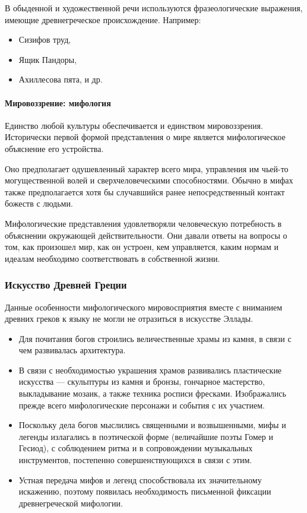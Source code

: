 В обыденной и художественной речи используются фразеологические выражения, имеющие древнегреческое происхождение. Например:
\begin{itemize}
    \item Сизифов труд,
    \item Ящик Пандоры,
    \item Ахиллесова пята, и др.
\end{itemize}

\paragraph{Мировоззрение: мифология} 
Единство любой культуры обеспечивается и единством мировоззрения. 
Исторически первой формой представления о мире является мифологическое объяснение его устройства. 

Оно предполагает одушевленный характер всего мира, управления им чьей-то могущественной волей и сверхчеловеческими способностями. Обычно в мифах также предполагается хотя бы случавшийся ранее непосредственный контакт божеств с людьми. 

Мифологические представления удовлетворяли человеческую потребность в объяснении окружающей действительности. Они давали ответы на вопросы о том, как произошел мир, как он устроен, кем управляется, каким нормам и идеалам необходимо соответствовать в собственной жизни.


\subsubsection{Искусство Древней Греции} 
Данные особенности мифологического мировосприятия вместе с вниманием древних
греков к языку не могли не отразиться в искусстве Эллады. 

\begin{itemize}
    \item Для почитания богов строились величественные храмы из камня, в связи с чем развивалась архитектура.
    \item В связи с необходимостью украшения храмов развивались пластические искусства --- скульптуры из камня и бронзы, гончарное мастерство, выкладывание мозаик, а также техника росписи фресками. Изображались прежде всего мифологические персонажи и события с их участием.
    \item Поскольку дела богов мыслились священными и возвышенными, мифы и легенды излагались в поэтической форме (величайшие поэты Гомер и Гесиод), с соблюдением ритма и в сопровождении музыкальных инструментов, постепенно совершенствующихся в связи с этим.
    \item Устная передача мифов и легенд способствовала их значительному искажению, поэтому появилась необходимость письменной фиксации древнегреческой мифологии.
\end{itemize}

